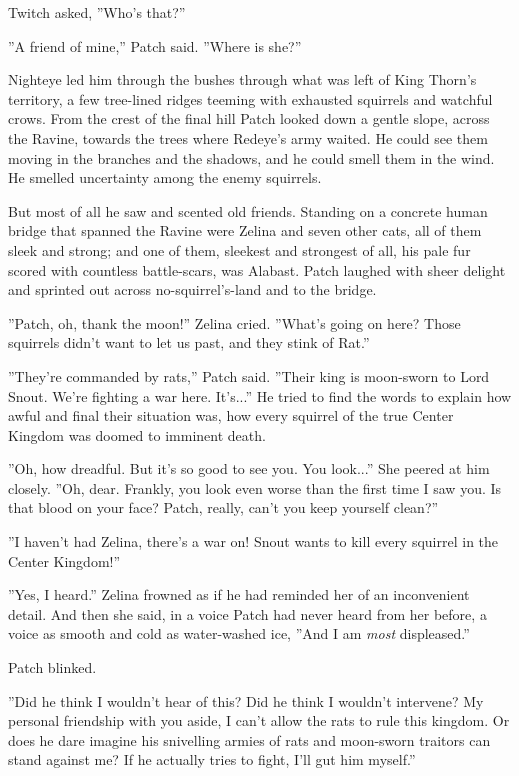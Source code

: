 \documentclass[12pt]{book}
\begin{document}
 Twitch asked, ''Who's that?''\par
 ''A friend of mine,'' Patch said. ''Where is she?''\par
 Nighteye led him through the bushes through what was left of King Thorn's territory, a few tree-lined ridges teeming with exhausted squirrels and watchful crows. From the crest of the final hill Patch looked down a gentle slope, across the Ravine, towards the trees where Redeye's army waited. He could see them moving in the branches and the shadows, and he could smell them in the wind. He smelled uncertainty among the enemy squirrels.\par
 But most of all he saw and scented old friends. Standing on a concrete human bridge that spanned the Ravine were Zelina and seven other cats, all of them sleek and strong; and one of them, sleekest and strongest of all, his pale fur scored with countless battle-scars, was Alabast. Patch laughed with sheer delight and sprinted out across no-squirrel's-land and to the bridge.\par
 ''Patch, oh, thank the moon!'' Zelina cried. ''What's going on here? Those squirrels didn't want to let us past, and they stink of Rat.''\par
 ''They're commanded by rats,'' Patch said. ''Their king is moon-sworn to Lord Snout. We're fighting a war here. It's...'' He tried to find the words to explain how awful and final their situation was, how every squirrel of the true Center Kingdom was doomed to imminent death.\par
 ''Oh, how dreadful. But it's so good to see you. You look...'' She peered at him closely. ''Oh, dear. Frankly, you look even worse than the first time I saw you. Is that blood on your face? Patch, really, can't you keep yourself clean?''\par
 ''I haven't had %
 Zelina, there's a war on! Snout wants to kill every squirrel in the Center Kingdom!''\par
''Yes, I heard.'' Zelina frowned as if he had reminded her of an inconvenient detail. And then she said, in a voice Patch had never heard from her before, a voice as smooth and cold as water-washed ice, ''And I am {\it most} displeased.''\par
 Patch blinked.\par
 ''Did he think I wouldn't hear of this? Did he think I wouldn't intervene? My personal friendship with you aside, I can't allow the rats to rule this kingdom. Or does he dare imagine his snivelling armies of rats and moon-sworn traitors can stand against me? If he actually tries to fight, I'll gut him myself.''\par
\end{document}
